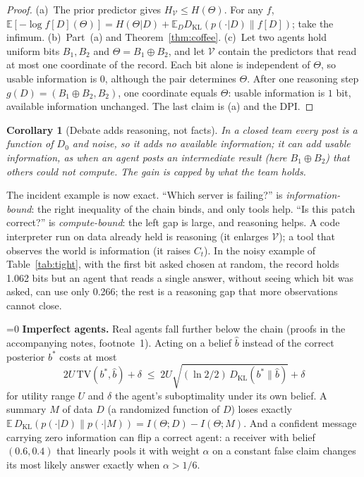 \documentclass[conference]{IEEEtran}
\providecommand{\PaperShort}{0}  %
\newtheorem{corollary}{Corollary}
\theoremstyle{definition}
\newcommand{\I}{I}
\newcommand{\Hh}{H}
\newcommand{\KL}{D_{\mathrm{KL}}}
\newcommand{\E}{\mathbb{E}}
\newcommand{\V}{\mathcal V}
\begin{document}
\begin{proof}
(a)~The prior predictor gives $\Hh_\V\le\Hh(\Theta)$. For any $f$,
$\E[-\log f[D](\Theta)]=\Hh(\Theta|D)+\E_D\KL(p(\cdot|D)\|f[D])$; take the
infimum. (b)~Part~(a) and Theorem~\ref{thm:coffee}. (c)~Let two agents hold
uniform bits $B_1,B_2$ and $\Theta=B_1\oplus B_2$, and let $\V$ contain the
predictors that read at most one coordinate of the record. Each bit alone is independent of $\Theta$, so usable
information is $0$, although the pair determines $\Theta$. After one reasoning
step $g(D)=(B_1\oplus B_2,B_2)$, one coordinate equals $\Theta$: usable
information is $1$ bit, available information unchanged. The last claim is (a)
and the DPI.
\end{proof}

\begin{corollary}[Debate adds reasoning, not facts]\label{cor:debate}
In a closed team every post is a function of $D_0$ and noise, so it adds no
available information; it can add usable information, as when an agent posts an
intermediate result (here $B_1\oplus B_2$) that others could not compute. The
gain is capped by what the team holds.
\end{corollary}

The incident example is now exact. ``Which server is failing?'' is
\emph{information-bound}: the right inequality of the chain binds, and only
tools help. ``Is this patch correct?'' is \emph{compute-bound}: the left gap is
large, and reasoning helps. A code interpreter run on data already held is
reasoning (it enlarges $\V$); a tool that observes the world is information (it
raises $C_t$). In the noisy example of Table~\ref{tab:tight}, with the first bit asked chosen at
random, the record holds 1.062 bits but an agent that reads a single answer,
without seeing which bit was asked, can use only 0.266; the rest is a reasoning
gap that more observations cannot close.

\ifnum\PaperShort=0
\noindent\textbf{Imperfect agents.} Real agents fall further below the chain
(proofs in the accompanying notes, footnote~1). Acting on a belief $\hat b$ instead of the
correct posterior $b^*$ costs at most
\[
2U\,\mathrm{TV}(b^*,\hat b)+\delta\;\le\;2U\sqrt{(\ln2/2)\,\KL(b^*\|\hat b)}+\delta
\]
for utility range $U$ and $\delta$ the agent's suboptimality under its own belief. A summary $M$ of data $D$ (a randomized function of $D$) loses exactly
$\E\,\KL(p(\cdot|D)\|p(\cdot|M))=\I(\Theta;D)-\I(\Theta;M)$. And a confident
message carrying zero information can flip a correct agent: a receiver with belief
$(0.6,0.4)$ that linearly pools it with weight $\alpha$ on a constant false
claim changes its most likely answer exactly when $\alpha>1/6$.
\fi
\end{document}
